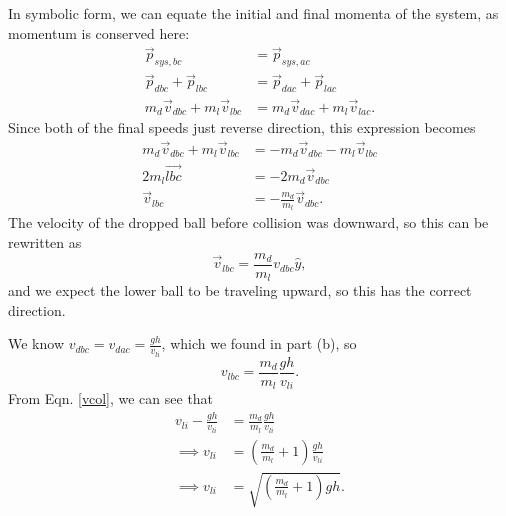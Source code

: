 {In symbolic form, we can equate the initial and final momenta of the system, as momentum is conserved here:
\[
\begin{split}
	\vec{p}_{sys,bc} & = \vec{p}_{sys,ac} \\
	\vec{p}_{dbc} + \vec{p}_{lbc} & = \vec{p}_{dac} + \vec{p}_{lac} \\
	m_{d}\vec{v}_{dbc} + m_{l}\vec{v}_{lbc} & = m_{d}\vec{v}_{dac} + m_{l}\vec{v}_{lac}.
\end{split}
\]
Since both of the final speeds just reverse direction, this expression becomes
\[
\begin{split}
	m_{d}\vec{v}_{dbc} + m_{l}\vec{v}_{lbc} & = -m_{d}\vec{v}_{dbc} - m_{l}\vec{v}_{lbc} \\
	2m_{l}\vec{lbc} & = -2m_{d}\vec{v}_{dbc} \\
	\vec{v}_{lbc} & = -\frac{m_{d}}{m_{l}}\vec{v}_{dbc}.
\end{split}
\]
The velocity of the dropped ball before collision was downward, so this can be rewritten as
\[
\vec{v}_{lbc} = \frac{m_{d}}{m_{l}}v_{dbc}\hat{y},
\]
and we expect the lower ball to be traveling upward, so this has the correct direction.

We know $v_{dbc} = v_{dac} = \frac{gh}{v_{li}}$, which we found in part (b), so
\[
v_{lbc} = \frac{m_{d}}{m_{l}}\frac{gh}{v_{li}}.
\]
From Eqn. \ref{vcol}, we can see that
\[
\begin{split}
	v_{li}-\frac{gh}{v_{li}} & = \frac{m_{d}}{m_{l}}\frac{gh}{v_{li}} \\
	\implies v_{li} & = \left(\frac{m_{d}}{m_{l}}+1\right)\frac{gh}{v_{li}} \\
	\implies v_{li} & = \sqrt{\left(\frac{m_{d}}{m_{l}}+1\right)gh}.
\end{split}
\]
}
